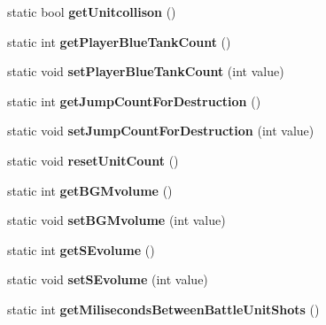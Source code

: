 \begin{DoxyCompactItemize}
\item 
static bool {\bfseries get\+Unitcollison} ()\hypertarget{class_game_settings_aeac78896ad8aac55d54e36452ed226c8}{}\label{class_game_settings_aeac78896ad8aac55d54e36452ed226c8}

\item 
static int {\bfseries get\+Player\+Blue\+Tank\+Count} ()\hypertarget{class_game_settings_a9934653147ad149f51cf0e3489be961a}{}\label{class_game_settings_a9934653147ad149f51cf0e3489be961a}

\item 
static void {\bfseries set\+Player\+Blue\+Tank\+Count} (int value)\hypertarget{class_game_settings_a3e0545d4fafb4af1a3bad7a5a2a474c9}{}\label{class_game_settings_a3e0545d4fafb4af1a3bad7a5a2a474c9}

\item 
static int {\bfseries get\+Jump\+Count\+For\+Destruction} ()\hypertarget{class_game_settings_a8f51a84a9cf7a93e00d07643974f55fb}{}\label{class_game_settings_a8f51a84a9cf7a93e00d07643974f55fb}

\item 
static void {\bfseries set\+Jump\+Count\+For\+Destruction} (int value)\hypertarget{class_game_settings_a884cbe017c236889d509e36d2f6a4f8b}{}\label{class_game_settings_a884cbe017c236889d509e36d2f6a4f8b}

\item 
static void {\bfseries reset\+Unit\+Count} ()\hypertarget{class_game_settings_a9ad65a0b954336d45ffb816af6cb9884}{}\label{class_game_settings_a9ad65a0b954336d45ffb816af6cb9884}

\item 
static int {\bfseries get\+B\+G\+Mvolume} ()\hypertarget{class_game_settings_a40fc00cb65266e231bd8fa17b42ef856}{}\label{class_game_settings_a40fc00cb65266e231bd8fa17b42ef856}

\item 
static void {\bfseries set\+B\+G\+Mvolume} (int value)\hypertarget{class_game_settings_a3eec97d0e385076fe812db30c966a7bf}{}\label{class_game_settings_a3eec97d0e385076fe812db30c966a7bf}

\item 
static int {\bfseries get\+S\+Evolume} ()\hypertarget{class_game_settings_ad762c594c185042c4b31a21691cc757e}{}\label{class_game_settings_ad762c594c185042c4b31a21691cc757e}

\item 
static void {\bfseries set\+S\+Evolume} (int value)\hypertarget{class_game_settings_a44db62397d2b3439492c0aea84a16c32}{}\label{class_game_settings_a44db62397d2b3439492c0aea84a16c32}

\item 
static int {\bfseries get\+Miliseconds\+Between\+Battle\+Unit\+Shots} ()\hypertarget{class_game_settings_ac915c3001cebddf35be247d5624b6dce}{}\label{class_game_settings_ac915c3001cebddf35be247d5624b6dce}

\end{DoxyCompactItemize}

